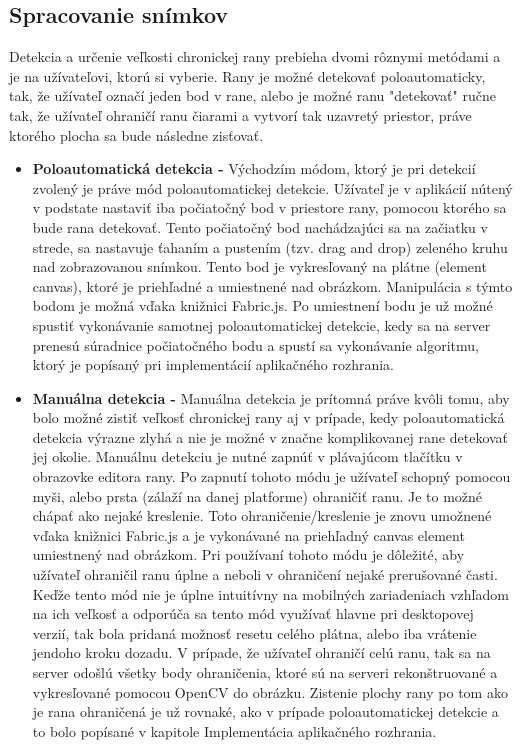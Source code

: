 \subsection{Spracovanie snímkov}
Detekcia a určenie veľkosti chronickej rany prebieha dvomi rôznymi metódami a je na užívateľovi, ktorú si vyberie. Rany je možné detekovať poloautomaticky, tak, že užívateľ označí jeden bod v rane, alebo je možné ranu "detekovať" ručne tak, že užívateľ ohraničí ranu čiarami a vytvorí tak uzavretý priestor, práve ktorého plocha sa bude následne zisťovať. 
\begin{itemize}
\item \textbf{Poloautomatická detekcia -} Východzím módom, ktorý je pri detekcií zvolený je práve mód poloautomatickej detekcie. Užívateľ je v aplikácií nútený v podstate nastaviť iba počiatočný bod v priestore rany, pomocou ktorého sa bude rana detekovať. Tento počiatočný bod nachádzajúci sa na začiatku v strede, sa nastavuje ťahaním a pustením (tzv. drag and drop) zeleného kruhu nad zobrazovanou snímkou. Tento bod je vykresľovaný na plátne (element canvas), ktoré je priehľadné a umiestnené nad obrázkom. Manipulácia s týmto bodom je možná vďaka knižnici Fabric.js. Po umiestnení bodu je už možné spustiť vykonávanie samotnej poloautomatickej detekcie, kedy sa na server prenesú súradnice počiatočného bodu a spustí sa vykonávanie algoritmu, ktorý je popísaný pri implementácií aplikačného rozhrania.  
\item \textbf{Manuálna detekcia -} Manuálna detekcia je prítomná práve kvôli tomu, aby bolo možné zistiť veľkosť chronickej rany aj v prípade, kedy poloautomatická detekcia výrazne zlyhá a nie je možné v značne komplikovanej rane detekovať jej okolie. Manuálnu detekciu je nutné zapnúť v plávajúcom tlačítku v obrazovke editora rany. Po zapnutí tohoto módu je užívateľ schopný pomocou myši, alebo prsta (zálaží na danej platforme) ohraničiť ranu. Je to možné chápať ako nejaké kreslenie. Toto ohraničenie/kreslenie je znovu umožnené vďaka knižnici Fabric.js a je vykonávané na priehľadný canvas element umiestnený nad obrázkom. Pri používaní tohoto módu je dôležité, aby užívateľ ohraničil ranu úplne a neboli v ohraničení nejaké prerušované časti. Keďže tento mód nie je úplne intuitívny na mobilných zariadeniach vzhľadom na ich veľkosť a odporúča sa tento mód využívať hlavne pri desktopovej verzií, tak bola pridaná možnosť resetu celého plátna, alebo iba vrátenie jendoho kroku dozadu.  V prípade, že užívateľ ohraničí celú ranu, tak sa na server odošlú všetky body ohraničenia, ktoré sú na serveri rekonštruované a vykresľované pomocou OpenCV do obrázku. Zistenie plochy rany po tom ako je rana ohraničená je už rovnaké, ako v prípade poloautomatickej detekcie a to bolo popísané v kapitole Implementácia aplikačného rozhrania.

\end{itemize}

